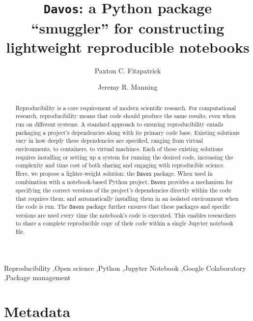 \documentclass[preprint,12pt,a4paper]{elsarticle}
\begin{document}
\begin{frontmatter}

\title{\texttt{Davos}: a Python package ``smuggler'' for constructing
  lightweight reproducible notebooks}
\author{Paxton C. Fitzpatrick}
\author{Jeremy R. Manning}
\address{Department of Psychological and Brain Sciences\\Dartmouth College, Hanover, NH 03755}


\begin{abstract}
  Reproducibility is a core requirement of modern scientific research.
  For computational research, reproducibility means that code should
  produce the same results, even when run on different systems.  A
  standard approach to ensuring reproducibility entails packaging a
  project's dependencies along with its primary code base.  Existing
  solutions vary in how deeply these dependencies are specified,
  ranging from virtual environments, to containers, to virtual
  machines.  Each of these existing solutions requires installing or
  setting up a system for running the desired code, increasing the
  complexity and time cost of both sharing and engaging with reproducible
  science. Here, we propose a lighter-weight solution: the
  \texttt{Davos} package.  When used in combination with a
  notebook-based Python project, \texttt{Davos} provides a mechanism
  for specifying the correct versions of the project's
  dependencies directly within the code that requires them,
  and automatically installing them in an isolated environment
  when the code is run. The \texttt{Davos} package further
  ensures that these packages and specific versions are used every
  time the notebook's code is executed.  This enables researchers to
  share a complete reproducible copy of their code within a single
  Jupyter notebook file.
\end{abstract}


\begin{keyword}
  Reproducibility \sep Open science \sep Python \sep Jupyter Notebook
  \sep Google Colaboratory \sep Package management
\end{keyword}

\end{frontmatter}


\section*{Metadata}
\end{document}
